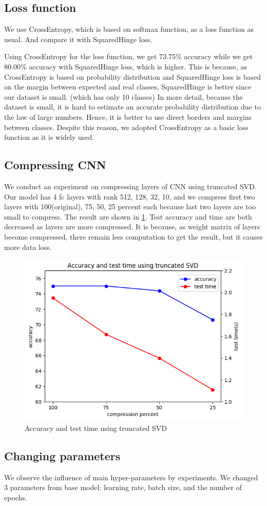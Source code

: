 \subsection{Loss function}
We use CrossEntropy, which is based on softmax function, as a loss function as usual. And compare it with SquaredHinge loss.

Using CrossEntropy for the loss function, we get 73.75\% accuracy while we get 80.00\% accuracy with SquaredHinge loss, which is higher. This is because, as CrossEntropy is based on probability distribution and SquaredHinge loss is based on the margin between expected and real classes, SquaredHinge is better since our dataset is small. (which has only 10 classes) In more detail, because the dataset is small, it is hard to estimate an accurate probability distribution due to the law of large numbers. Hence, it is better to use direct borders and margins between classes. Despite this reason, we adopted CrossEntropy as a basic loss function as it is widely used.

\subsection{Compressing CNN}
We conduct an experiment on compressing layers of CNN using truncated SVD. Our model has 4 fc layers with rank 512, 128, 32, 10, and we compress first two layers with 100(original), 75, 50, 25 percent each because last two layers are too small to compress. The result are shown in \cref{fig:cnn_svd}. Test accuracy and time are both decreased as layers are more compressed. It is because, as weight matrix of layers become compressed, there remain less computation to get the result, but it causes more data loss.

\begin{figure}
	\centering
	\includegraphics[width=0.4\linewidth]{image/q4-6-svd.png}
	\caption{Accuracy and test time using truncated SVD}
	\label{fig:cnn_svd}
\end{figure}

\subsection{Changing parameters}
We observe the influence of main hyper-parameters by experiments. We changed 3 parameters from base model: learning rate, batch size, and the number of epochs.

